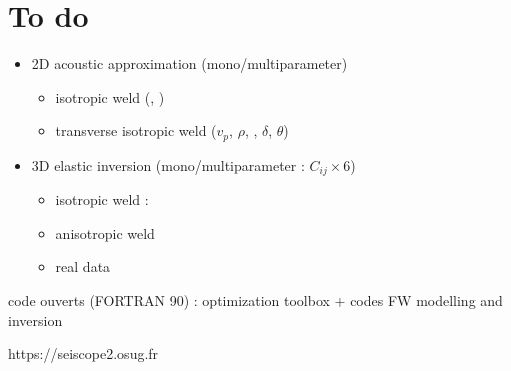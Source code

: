 \documentclass[11pt,xcolor=x11names,compress, notes=show]{beamer}%
\begin{document}
\begin{frame}
\end{frame}

\section{To do}
\begin{frame}{\insertsectionhead}
	\begin{itemize}
		\item 2D acoustic approximation (mono/multiparameter)
		\begin{itemize}
			\item isotropic weld (, )
			\item transverse isotropic weld ($v_{p}$, $\rho$, , $\delta$, $\theta$)
		\end{itemize}
		\item 3D elastic inversion (mono/multiparameter : $C_{ij}\times$6)
		\begin{itemize}
			\item isotropic weld : 
			\item anisotropic weld
			\item real data
		\end{itemize}		
	\end{itemize}
\end{frame}
\begin{frame}
code ouverts (FORTRAN 90) : optimization toolbox + codes FW modelling and inversion

 https://seiscope2.osug.fr
\end{frame}
\end{document}
